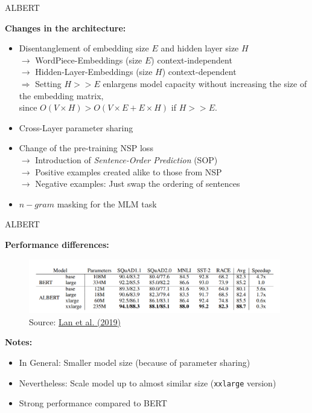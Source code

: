 \documentclass[]{beamer}
\begin{document}
\begin{frame}{ALBERT \href{https://arxiv.org/pdf/1909.11942.pdf}{}}

	\textbf{Changes in the architecture:}

	\begin{itemize}
		\item Disentanglement of embedding size $E$ and hidden layer size $H$\\
					$\rightarrow$ WordPiece-Embeddings (size $E$) context-independent\\
					$\rightarrow$ Hidden-Layer-Embeddings (size $H$) context-dependent\\
					$\Rightarrow$ Setting $H >> E$ enlargens model capacity without increasing the size of the embedding matrix,\\
					since $O(V \times H) > O(V \times E +  E \times H)$ if $H >> E$.
		\item Cross-Layer parameter sharing
		\item Change of the pre-training NSP loss\\
					$\rightarrow$ Introduction of \textit{Sentence-Order Prediction} (SOP)\\
					$\rightarrow$ Positive examples created alike to those from NSP\\
					$\rightarrow$ Negative examples: Just swap the ordering of sentences
		\item $n-gram$ masking for the MLM task
\end{itemize}
\end{frame}



\begin{frame}{ALBERT \href{https://arxiv.org/pdf/1909.11942.pdf}{}}

	\textbf{Performance differences:}

	\begin{figure}
		\centering
		\includegraphics[width = 11cm]{figure/albert-sota.png}\\ 
		\footnotesize{Source:} \href{https://arxiv.org/pdf/1907.11942.pdf}{\footnotesize Lan et al. (2019)}
	\end{figure}

	\textbf{Notes:}

	\begin{itemize}
		\item In General: Smaller model size (because of parameter sharing)
		\item Nevertheless: Scale model up to almost similar size (\texttt{xxlarge} version)
		\item Strong performance compared to BERT
	\end{itemize}
\end{frame}
\end{document}
